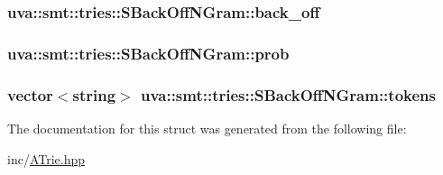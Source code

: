 \subsubsection[{back\+\_\+off}]{ uva\+::smt\+::tries\+::\+S\+Back\+Off\+N\+Gram\+::back\+\_\+off}\label{structuva_1_1smt_1_1tries_1_1_s_back_off_n_gram_ae299498d72b31a024af702332ff6a49c}
\hypertarget{structuva_1_1smt_1_1tries_1_1_s_back_off_n_gram_a3af5b26367189b16778ff72a5cd29abc}{}
\subsubsection[{prob}]{ uva\+::smt\+::tries\+::\+S\+Back\+Off\+N\+Gram\+::prob}\label{structuva_1_1smt_1_1tries_1_1_s_back_off_n_gram_a3af5b26367189b16778ff72a5cd29abc}
\hypertarget{structuva_1_1smt_1_1tries_1_1_s_back_off_n_gram_ab862f62269c845d2587dfcb7b9491271}{}
\subsubsection[{tokens}]{\setlength{\rightskip}{0pt plus 5cm}vector$<$string$>$ uva\+::smt\+::tries\+::\+S\+Back\+Off\+N\+Gram\+::tokens}\label{structuva_1_1smt_1_1tries_1_1_s_back_off_n_gram_ab862f62269c845d2587dfcb7b9491271}


The documentation for this struct was generated from the following file\+:\begin{DoxyCompactItemize}
\item 
inc/\hyperlink{_a_trie_8hpp}{A\+Trie.\+hpp}\end{DoxyCompactItemize}
